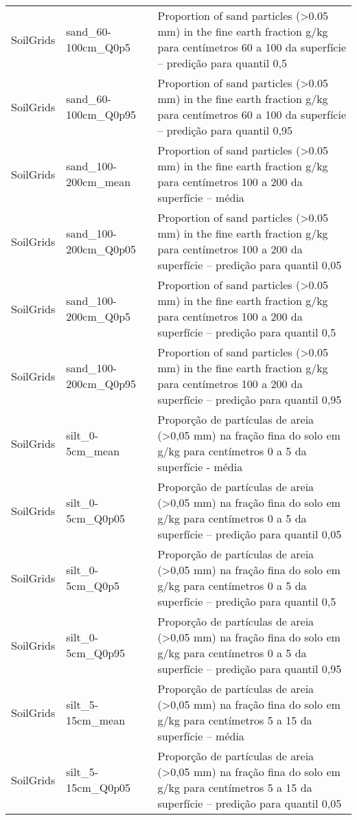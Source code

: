 \begin{longtable}{@{} p{4cm} p{4cm} p{8cm} @{}}
	SoilGrids &
	sand\_60-100cm\_Q0p5 &
	Proportion of sand particles (\textgreater 0.05 mm) in the fine earth fraction g/kg para centímetros 60 a 100 da superfície – predição para quantil 0,5 \\
	SoilGrids &
	sand\_60-100cm\_Q0p95 &
	Proportion of sand particles (\textgreater 0.05 mm) in the fine earth fraction g/kg para centímetros 60 a 100 da superfície – predição para quantil 0,95 \\
	SoilGrids &
	sand\_100-200cm\_mean &
	Proportion of sand particles (\textgreater 0.05 mm) in the fine earth fraction g/kg para centímetros 100 a 200 da superfície – média \\
	SoilGrids &
	sand\_100-200cm\_Q0p05 &
	Proportion of sand particles (\textgreater 0.05 mm) in the fine earth fraction g/kg para centímetros 100 a 200 da superfície – predição para quantil 0,05 \\
	SoilGrids &
	sand\_100-200cm\_Q0p5 &
	Proportion of sand particles (\textgreater 0.05 mm) in the fine earth fraction g/kg para centímetros 100 a 200 da superfície – predição para quantil 0,5 \\
	SoilGrids &
	sand\_100-200cm\_Q0p95 &
	Proportion of sand particles (\textgreater 0.05 mm) in the fine earth fraction g/kg para centímetros 100 a 200 da superfície – predição para quantil 0,95 \\
	SoilGrids &
	silt\_0-5cm\_mean &
	Proporção de partículas de areia (\textgreater 0,05 mm) na fração fina do solo em g/kg para centímetros 0 a 5 da superfície - média \\
	SoilGrids &
	silt\_0-5cm\_Q0p05 &
	Proporção de partículas de areia (\textgreater 0,05 mm) na fração fina do solo em g/kg para centímetros 0 a 5 da superfície – predição para quantil 0,05 \\
	SoilGrids &
	silt\_0-5cm\_Q0p5 &
	Proporção de partículas de areia (\textgreater 0,05 mm) na fração fina do solo em g/kg para centímetros 0 a 5 da superfície – predição para quantil 0,5 \\
	SoilGrids &
	silt\_0-5cm\_Q0p95 &
	Proporção de partículas de areia (\textgreater 0,05 mm) na fração fina do solo em g/kg para centímetros 0 a 5 da superfície – predição para quantil 0,95 \\
	SoilGrids &
	silt\_5-15cm\_mean &
	Proporção de partículas de areia (\textgreater 0,05 mm) na fração fina do solo em g/kg para centímetros 5 a 15 da superfície – média \\
	SoilGrids &
	silt\_5-15cm\_Q0p05 &
	Proporção de partículas de areia (\textgreater 0,05 mm) na fração fina do solo em g/kg para centímetros 5 a 15 da superfície – predição para quantil 0,05 \\

\end{longtable}
